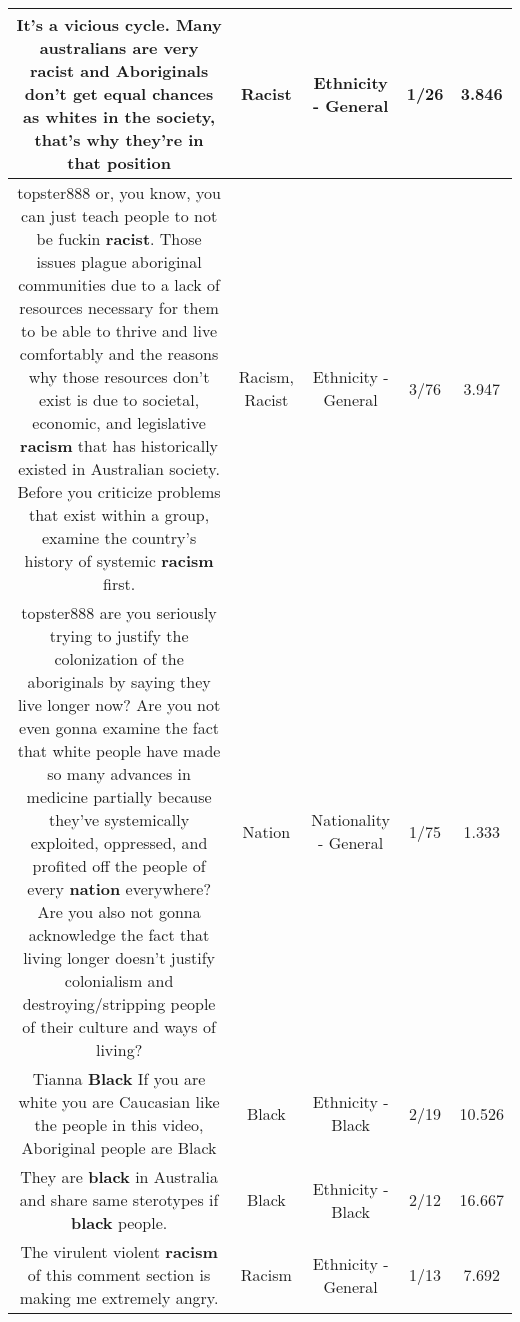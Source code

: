 \documentclass[11pt]{article}
\newlength\mylength
\begin{document}
\begin{center}
\begin{longtable}{|C{.65\mylength}|C{.30\mylength}|C{.12\mylength}|C{.12\mylength}|C{.12\mylength}|}
  \small It's a vicious cycle. Many australians are very \textbf{racist} and Aboriginals don't get equal chances as whites in the society, that's why they're in that position\normalsize   & Racist & Ethnicity - General & 1/26 & 3.846 \\  \hline
  \small topster888 or, you know, you can just teach people to not be fuckin \textbf{racist}. Those issues plague aboriginal communities due to a lack of resources necessary for them to be able to thrive and live comfortably and the reasons why those resources don't exist is due to societal, economic, and legislative \textbf{racism} that has historically existed in Australian society. Before you criticize problems that exist within a group, examine the country's history of systemic \textbf{racism} first.\normalsize   & Racism, Racist & Ethnicity - General & 3/76 & 3.947 \\  \hline
  \small topster888 are you seriously trying to justify the colonization of the aboriginals by saying they live longer now? Are you not even gonna examine the fact that white people have made so many advances in medicine partially because they've systemically exploited, oppressed, and profited off the people of every \textbf{nation} everywhere? Are you also not gonna acknowledge the fact that living longer doesn't justify colonialism and destroying/stripping people of their culture and ways of living?\normalsize   & Nation & Nationality - General & 1/75 & 1.333 \\  \hline
  \small Tianna \textbf{Black} If you are white you are Caucasian like the people in this video, Aboriginal people are Black\normalsize   & Black & Ethnicity - Black & 2/19 & 10.526 \\  \hline
  \small They are \textbf{black} in Australia and share same sterotypes if \textbf{black} people.\normalsize   & Black & Ethnicity - Black & 2/12 & 16.667 \\  \hline
  \small The virulent violent \textbf{racism} of this comment section is making me extremely angry.\normalsize   & Racism & Ethnicity - General & 1/13 & 7.692 \\  \hline

\end{longtable}
\end{center}
\end{document}
